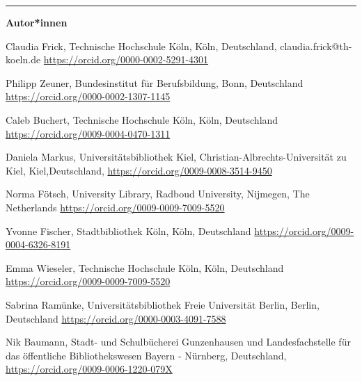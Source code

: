 \begin{center}\rule{0.5\linewidth}{0.5pt}\end{center}

\textbf{Autor*innen}

Claudia Frick, Technische Hochschule Köln, Köln, Deutschland, claudia.frick@th-koeln.de\newline
\url{https://orcid.org/0000-0002-5291-4301}

Philipp Zeuner, Bundesinstitut für Berufsbildung, Bonn, Deutschland\newline
\url{https://orcid.org/0000-0002-1307-1145}

Caleb Buchert, Technische Hochschule Köln, Köln, Deutschland\newline
\url{https://orcid.org/0009-0004-0470-1311}

Daniela Markus, Universitätsbibliothek Kiel, Christian-Albrechts-Universität zu Kiel, Kiel,\linebreak Deutschland, \url{https://orcid.org/0009-0008-3514-9450}

Norma Fötsch, University Library, Radboud University, Nijmegen, The Netherlands\newline
\url{https://orcid.org/0009-0009-7009-5520}

Yvonne Fischer, Stadtbibliothek Köln, Köln, Deutschland\newline
\url{https://orcid.org/0009-0004-6326-8191}

Emma Wieseler, Technische Hochschule Köln, Köln, Deutschland\newline
\url{https://orcid.org/0009-0009-7009-5520}

Sabrina Ramünke, Universitätsbibliothek Freie Universität Berlin, Berlin, Deutschland\newline
\url{https://orcid.org/0000-0003-4091-7588}

Nik Baumann, Stadt- und Schulbücherei Gunzenhausen und Landesfachstelle für das öffentliche Bibliothekswesen Bayern - Nürnberg, Deutschland, \url{https://orcid.org/0009-0006-1220-079X}